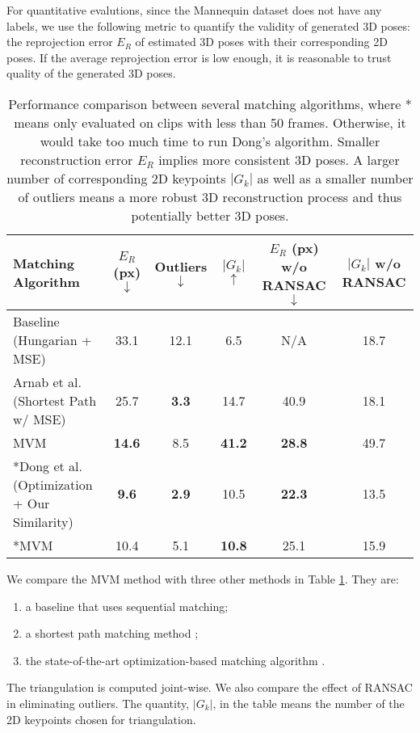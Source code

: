 \documentclass{article}
\begin{document}
For quantitative evalutions, since the Mannequin dataset does not
have any labels, we use the following metric to quantify the
validity of generated 3D poses:
the reprojection error $E_R$ of estimated 3D poses with their corresponding 2D poses. If the average reprojection error is low enough, it is reasonable to trust quality of the generated 3D poses. 

\begin{table}[h]
\hspace*{-1.5cm}
\centering
\begin{tabular}{l|ccc|cc} \hline \hline
Matching Algorithm & $E_R$ (px) $\downarrow$ & Outliers $\downarrow$ 
& $|G_k|$ $\uparrow$ & $E_R$ (px) w/o RANSAC $\downarrow$ 
& $|G_k|$ w/o RANSAC \\ \hline \hline
Baseline (Hungarian + MSE) & 33.1 & 12.1 & 6.5 & N/A & 18.7 \\
Arnab et al. \cite{arnab2019exploiting} (Shortest Path w/ MSE) & 25.7 
& \textbf{3.3} & 14.7 & 40.9 & 18.1 \\
MVM & \textbf{14.6} & 8.5 & \textbf{41.2} & \textbf{28.8} & 49.7\\ \hline
*Dong et al. \cite{dong2019fast} (Optimization + Our Similarity) 
& \textbf{9.6} & \textbf{2.9} & 10.5 & \textbf{22.3} & 13.5 \\
*MVM & 10.4 & 5.1 & \textbf{10.8} & 25.1 & 15.9 \\ \hline \hline
\end{tabular}
\caption{Performance comparison between several matching algorithms,
where * means only evaluated on clips with less than 50 frames.
Otherwise, it would take too much time to run Dong's algorithm. Smaller reconstruction error $E_R$ implies more consistent 3D poses. A larger number of corresponding 2D keypoints $|G_k|$ as well as a smaller number of outliers means a more robust 3D reconstruction process and thus potentially better 3D poses.}
\label{tab:matching}
\end{table}



We compare the MVM method with three other methods in Table
\ref{tab:matching}. They are:
\begin{enumerate} 
\item a baseline that uses sequential matching;
\item a shortest path matching method \cite{arnab2019exploiting};
\item the state-of-the-art optimization-based matching algorithm \cite{dong2019fast}.  
\end{enumerate} 
The triangulation is computed joint-wise.  We also compare the effect of
RANSAC in eliminating outliers. The quantity, $|G_k|$, in the table
means the number of the 2D keypoints chosen for triangulation. 
\end{document}
